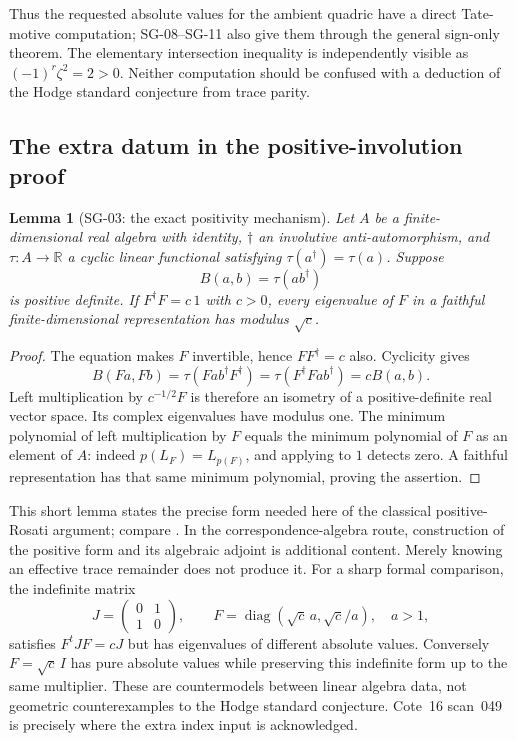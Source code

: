 \documentclass[11pt,a4paper]{article}
\newtheorem{lemma}[theorem]{Lemma}
\theoremstyle{remark}
\begin{document}
Thus the requested absolute values for the ambient quadric have a direct Tate-motive computation; SG-08--SG-11 also give them through the general sign-only theorem. The elementary intersection inequality is independently visible as $(-1)^r\zeta^2=2>0$. Neither computation should be confused with a deduction of the Hodge standard conjecture from trace parity.

\subsection{The extra datum in the positive-involution proof}

\begin{lemma}[SG-03: the exact positivity mechanism]
Let $A$ be a finite-dimensional real algebra with identity, $\dagger$ an involutive anti-automorphism, and $\tau:A\to\mathbb R$ a cyclic linear functional satisfying $\tau(a^\dagger)=\tau(a)$. Suppose
\[
 B(a,b)=\tau(ab^\dagger)
\]
is positive definite. If $F^\dagger F=c\,1$ with $c>0$, every eigenvalue of $F$ in a faithful finite-dimensional representation has modulus $\sqrt c$.
\end{lemma}

\begin{proof}
The equation makes $F$ invertible, hence $FF^\dagger=c$ also. Cyclicity gives
\[
 B(Fa,Fb)=\tau(Fab^\dagger F^\dagger)
        =\tau(F^\dagger F ab^\dagger)=cB(a,b).
\]
Left multiplication by $c^{-1/2}F$ is therefore an isometry of a positive-definite real vector space. Its complex eigenvalues have modulus one. The minimum polynomial of left multiplication by $F$ equals the minimum polynomial of $F$ as an element of $A$: indeed $p(L_F)=L_{p(F)}$, and applying to $1$ detects zero. A faithful representation has that same minimum polynomial, proving the assertion.
\end{proof}

This short lemma states the precise form needed here of the classical positive-Rosati argument; compare \cite[Th.~13.2 and Lemmas~14.2--14.3]{MilneAV}. In the correspondence-algebra route, construction of the positive form and its algebraic adjoint is additional content. Merely knowing an effective trace remainder does not produce it. For a sharp formal comparison, the indefinite matrix
\[
 J=\begin{pmatrix}0&1\\1&0\end{pmatrix},\qquad
 F=\operatorname{diag}(\sqrt c\,a,\sqrt c/a),\quad a>1,
\]
satisfies $F^tJF=cJ$ but has eigenvalues of different absolute values. Conversely $F=\sqrt c\,I$ has pure absolute values while preserving this indefinite form up to the same multiplier. These are countermodels between linear algebra data, not geometric counterexamples to the Hodge standard conjecture. Cote~16 scan~049 is precisely where the extra index input is acknowledged.
\end{document}
